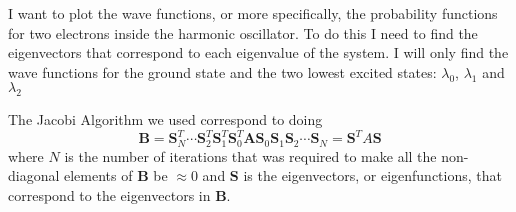 

I want to plot the wave functions, or more specifically, the probability
functions for two electrons inside the harmonic oscillator.
To do this I need to find the eigenvectors that correspond to each eigenvalue
of the system. I will only find the wave functions for the ground state and the two lowest
excited states: $\lambda_0$, $\lambda_1$ and $\lambda_2$

The Jacobi Algorithm we used correspond to doing
$$
\mathbf{B} = \mathbf{S}^T_N \cdots \mathbf{S}^T_2 \mathbf{S}^T_1 \mathbf{S}^T_0
             \mathbf{A}
             \mathbf{S}_0 \mathbf{S}_1 \mathbf{S}_2 \cdots \mathbf{S}_N
           = \mathbf{S}^T A \mathbf{S}
$$
where $N$ is the number of iterations that was required to make all the
non-diagonal elements of $\mathbf{B}$ be $\approx 0$ and $\mathbf{S}$ is the
eigenvectors, or eigenfunctions, that correspond to the eigenvectors in
$\mathbf{B}$.
